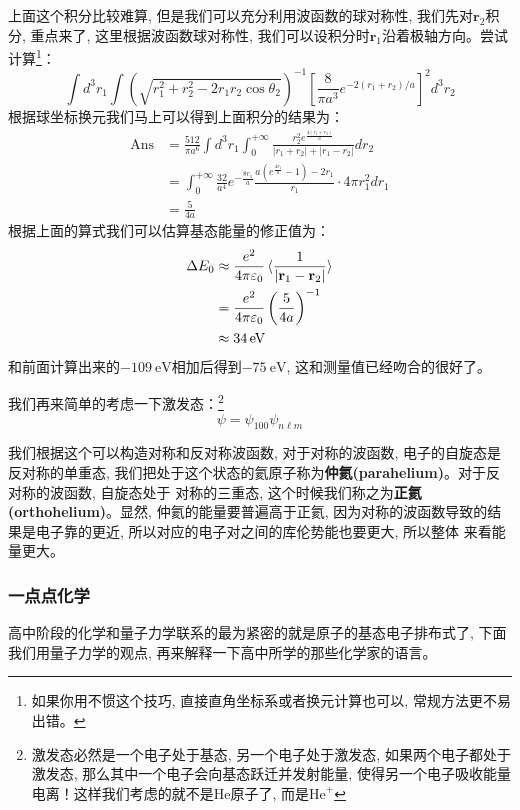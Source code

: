 \documentclass[a4paper,zihao=-4,linespread=1]{ctexrep}
\begin{document}
    上面这个积分比较难算, 但是我们可以充分利用波函数的球对称性, 我们先对$\mathbf{r}_2$积分, 重点来了, 这里根据波函数球对称性, 我们可以设积分时$\mathbf{r}_1$沿着极轴方向。尝试计算\footnote{如果你用不惯这个技巧, 直接直角坐标系或者换元计算也可以, 常规方法更不易出错。}：
    \begin{equation}
        \int d^3r_1 \int \left(\sqrt{r_{1}^{2}+r_{2}^{2}-2 r_{1} r_{2} \cos \theta_{2}}\right)^{-1}\left[\frac{8}{\pi a^{3}} e^{-2\left(r_{1}+r_{2}\right) / a}\right]^2d^3r_2
    \end{equation}
    根据球坐标换元我们马上可以得到上面积分的结果为：
    \begin{align*}
        \mathrm{Ans}&=\frac{512}{\pi a^6}\int d^3r_1\int_0^{+\infty}\frac{r_2^2 e^{\frac{4(r_1+r_2)}{a}}}{|r_1+r_2|+|r_1-r_2|}dr_2\\
        &=\int_0^{+\infty}\frac{32}{a^4}e^{-\frac{8r_1}{a}}\frac{a(e^{\frac{4r_1}{a}}-1)-2r_1}{r_1}\cdot 4\pi r_1^2dr_1\\
        &=\boxed{\frac{5}{4a}}
    \end{align*}
    根据上面的算式我们可以估算基态能量的修正值为：
    \begin{align*}
        \Delta E_0&\approx\frac{e^2}{4\pi\varepsilon_0}\braket{\frac{1}{\left|\mathbf{r}_1-\mathbf{r}_2\right|}}\\&=\frac{e^2}{4\pi\varepsilon_0}\left(\frac{5}{4a}\right)^{-1}\\
        &\approx\SI{34}{\eV}
    \end{align*}
    和前面计算出来的$\SI{-109}{\eV}$相加后得到$\SI{-75}{\eV}$, 这和测量值已经吻合的很好了。

    我们再来简单的考虑一下激发态：\footnote{激发态必然是一个电子处于基态, 另一个电子处于激发态, 如果两个电子都处于激发态, 那么其中一个电子会向基态跃迁并发射能量, 使得另一个电子吸收能量电离！这样我们考虑的就不是$\mathrm{He}$原子了, 而是$\mathrm{He}^+$}
    \[\psi=\psi_{100}\psi_{n\ell m}\]

    我们根据这个可以构造对称和反对称波函数, 对于对称的波函数, 电子的自旋态是反对称的单重态, 我们把处于这个状态的氦原子称为\textbf{仲氦(parahelium)}。对于反对称的波函数, 自旋态处于
    对称的三重态, 这个时候我们称之为\textbf{正氦(orthohelium)}。显然, 仲氦的能量要普遍高于正氦, 因为对称的波函数导致的结果是电子靠的更近, 所以对应的电子对之间的库伦势能也要更大, 所以整体
    来看能量更大。

    \subsubsection*{一点点化学}
    高中阶段的化学和量子力学联系的最为紧密的就是原子的基态电子排布式了, 下面我们用量子力学的观点, 再来解释一下高中所学的那些化学家的语言。
\end{document}
